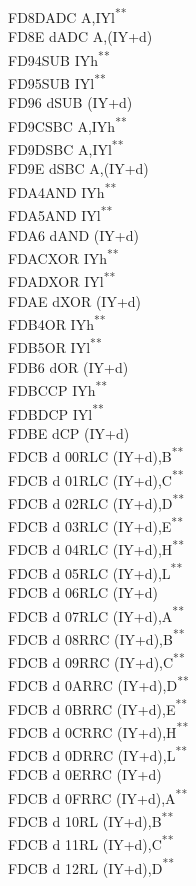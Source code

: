 \documentclass[twoside,openright,a4paper]{book}
\newcommand{\UNDOC}{\textnormal{\textsuperscript{**}}}
\begin{document}
\begin{multicols}{3}
{\begin{tabbing}
	FD8D\>ADC A,IYl\UNDOC\\
	FD8E d\>ADC A,(IY+d)\\
	FD94\>SUB IYh\UNDOC\\
	FD95\>SUB IYl\UNDOC\\
	FD96 d\>SUB (IY+d)\\
	FD9C\>SBC A,IYh\UNDOC\\
	FD9D\>SBC A,IYl\UNDOC\\
	FD9E d\>SBC A,(IY+d)\\
	FDA4\>AND IYh\UNDOC\\
	FDA5\>AND IYl\UNDOC\\
	FDA6 d\>AND (IY+d)\\
	FDAC\>XOR IYh\UNDOC\\
	FDAD\>XOR IYl\UNDOC\\
	FDAE d\>XOR (IY+d)\\
	FDB4\>OR IYh\UNDOC\\
	FDB5\>OR IYl\UNDOC\\
	FDB6 d\>OR (IY+d)\\
	FDBC\>CP IYh\UNDOC\\
	FDBD\>CP IYl\UNDOC\\
	FDBE d\>CP (IY+d)\\
	FDCB d 00\>RLC (IY+d),B\UNDOC\\
	FDCB d 01\>RLC (IY+d),C\UNDOC\\
	FDCB d 02\>RLC (IY+d),D\UNDOC\\
	FDCB d 03\>RLC (IY+d),E\UNDOC\\
	FDCB d 04\>RLC (IY+d),H\UNDOC\\
	FDCB d 05\>RLC (IY+d),L\UNDOC\\
	FDCB d 06\>RLC (IY+d)\\
	FDCB d 07\>RLC (IY+d),A\UNDOC\\
	FDCB d 08\>RRC (IY+d),B\UNDOC\\
	FDCB d 09\>RRC (IY+d),C\UNDOC\\
	FDCB d 0A\>RRC (IY+d),D\UNDOC\\
	FDCB d 0B\>RRC (IY+d),E\UNDOC\\
	FDCB d 0C\>RRC (IY+d),H\UNDOC\\
	FDCB d 0D\>RRC (IY+d),L\UNDOC\\
	FDCB d 0E\>RRC (IY+d)\\
	FDCB d 0F\>RRC (IY+d),A\UNDOC\\
	FDCB d 10\>RL (IY+d),B\UNDOC\\
	FDCB d 11\>RL (IY+d),C\UNDOC\\
	FDCB d 12\>RL (IY+d),D\UNDOC\\

\end{tabbing}}
\end{multicols}
\end{document}
